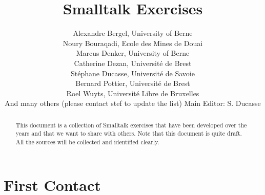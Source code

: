 \let\wholebook=\relax


\title{Smalltalk Exercises}
\author{
Alexandre Bergel, University of Berne\\
Noury Bouraqadi, Ecole des Mines de Douai\\
Marcus Denker, University of Berne \\
Catherine Dezan, Universit\'e de Brest\\
St\'ephane Ducasse, Universit\'e de Savoie\\
Bernard Pottier, Universit\'e de Brest\\
Roel Wuyts, Universit\'e Libre de Bruxelles \\
And many others (please contact stef to update the list)
Main Editor: S. Ducasse}

\begin{abstract}
This document is a collection of Smalltalk exercises that 
have been developed over the years and that we want to share
with others. Note that this document is quite draft. All the sources will be collected and identified clearly. 
\end{abstract}
\maketitle



\tableofcontents

\part{First Contact}
%



%
%
%

%
%
%



